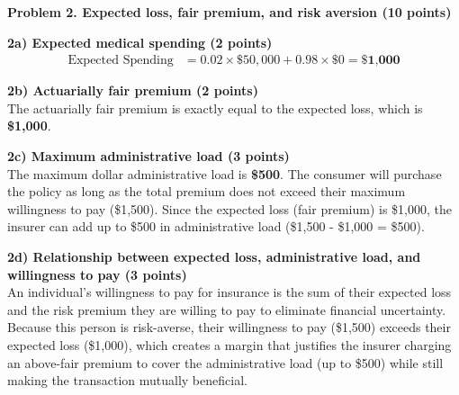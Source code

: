 \documentclass[11pt, letterpaper]{article}
\begin{document}
\textbf{Problem 2. Expected loss, fair premium, and risk aversion (10 points)}

\textbf{2a) Expected medical spending (2 points)} \\
\begin{align*}
    \text{Expected Spending} &= 0.02 \times \$50,000 + 0.98 \times \$0 = \textbf{\$1,000}
\end{align*}

\textbf{2b) Actuarially fair premium (2 points)} \\
The actuarially fair premium is exactly equal to the expected loss, which is \textbf{\$1,000}.

\textbf{2c) Maximum administrative load (3 points)} \\
The maximum dollar administrative load is \textbf{\$500}. The consumer will purchase the policy as long as the total premium does not exceed their maximum willingness to pay (\$1,500). Since the expected loss (fair premium) is \$1,000, the insurer can add up to \$500 in administrative load (\$1,500 - \$1,000 = \$500).

\textbf{2d) Relationship between expected loss, administrative load, and willingness to pay (3 points)} \\
An individual's willingness to pay for insurance is the sum of their expected loss and the risk premium they are willing to pay to eliminate financial uncertainty. Because this person is risk-averse, their willingness to pay (\$1,500) exceeds their expected loss (\$1,000), which creates a margin that justifies the insurer charging an above-fair premium to cover the administrative load (up to \$500) while still making the transaction mutually beneficial.
\end{document}
